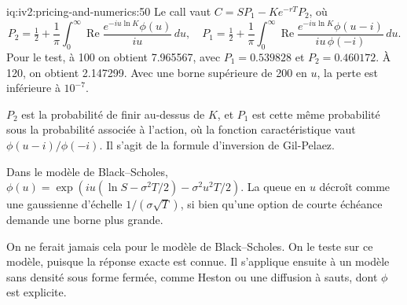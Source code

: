 \begin{solution}{iq:iv2:pricing-and-numerics:50}
Le call vaut $C = SP_1 - Ke^{-rT}P_2$, où
\[
P_2 = \tfrac12 + \frac1\pi\int_0^\infty\operatorname{Re}\frac{e^{-iu\ln K}\phi(u)}{iu}\,du, \quad
P_1 = \tfrac12 + \frac1\pi\int_0^\infty\operatorname{Re}\frac{e^{-iu\ln K}\phi(u - i)}{iu\,\phi(-i)}\,du.
\]
Pour le test, à 100 on obtient 7.965567, avec $P_1 = 0.539828$ et $P_2 = 0.460172$. À 120, on obtient 2.147299. Avec une borne supérieure de 200 en $u$, la perte est inférieure à $10^{-7}$.

$P_2$ est la probabilité de finir au-dessus de $K$, et $P_1$ est cette même probabilité sous la probabilité associée à l'action, où la fonction caractéristique vaut $\phi(u - i)/\phi(-i)$. Il s'agit de la formule d'inversion de Gil-Pelaez.

Dans le modèle de Black--Scholes, $\phi(u) = \exp(iu(\ln S - \sigma^2T/2) - \sigma^2u^2T/2)$. La queue en $u$ décroît comme une gaussienne d'échelle $1/(\sigma\sqrt T)$, si bien qu'une option de courte échéance demande une borne plus grande.

On ne ferait jamais cela pour le modèle de Black--Scholes. On le teste sur ce modèle, puisque la réponse exacte est connue. Il s'applique ensuite à un modèle sans densité sous forme fermée, comme Heston ou une diffusion à sauts, dont $\phi$ est explicite.

\end{solution}
